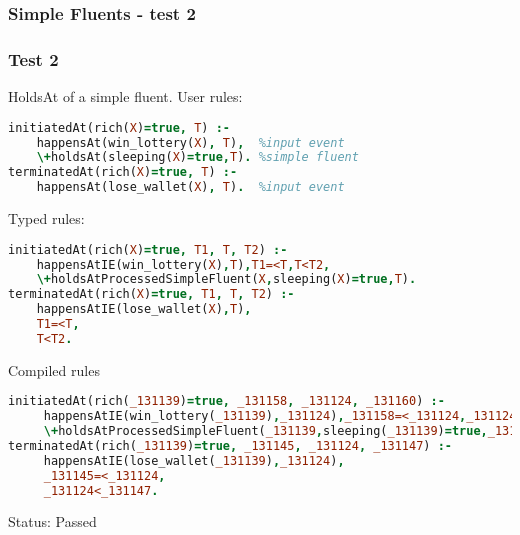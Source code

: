 \documentclass[8pt]{beamer}
\begin{document}
\begin{frame}[fragile]
\frametitle{Simple Fluents - test 2}
\subsubsection{Test 2}
\small
HoldsAt of a simple fluent.\linebreak
User rules:
\begin{tiny}
\begin{lstlisting}[language=Prolog]
initiatedAt(rich(X)=true, T) :-
    happensAt(win_lottery(X), T),  %input event
    \+holdsAt(sleeping(X)=true,T). %simple fluent
terminatedAt(rich(X)=true, T) :-
    happensAt(lose_wallet(X), T).  %input event
\end{lstlisting}
\end{tiny}
Typed rules:
\begin{tiny}
\begin{lstlisting}[language=Prolog]
initiatedAt(rich(X)=true, T1, T, T2) :-
    happensAtIE(win_lottery(X),T),T1=<T,T<T2,
    \+holdsAtProcessedSimpleFluent(X,sleeping(X)=true,T).
terminatedAt(rich(X)=true, T1, T, T2) :-
    happensAtIE(lose_wallet(X),T),
    T1=<T,
    T<T2.
\end{lstlisting}
\end{tiny}
Compiled rules
\begin{tiny}
\begin{lstlisting}[language=Prolog]
initiatedAt(rich(_131139)=true, _131158, _131124, _131160) :-
     happensAtIE(win_lottery(_131139),_131124),_131158=<_131124,_131124<_131160,
     \+holdsAtProcessedSimpleFluent(_131139,sleeping(_131139)=true,_131124).
terminatedAt(rich(_131139)=true, _131145, _131124, _131147) :-
     happensAtIE(lose_wallet(_131139),_131124),
     _131145=<_131124,
     _131124<_131147.
\end{lstlisting}
\end{tiny}
Status: Passed
\end{frame}
\end{document}
